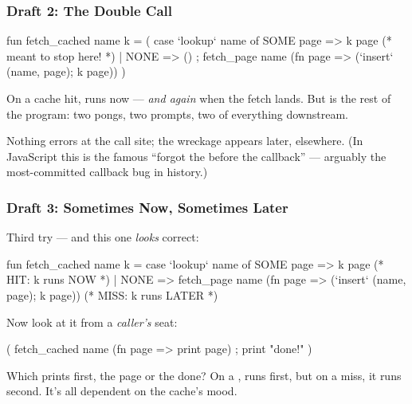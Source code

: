 \documentclass[aspectratio=169]{beamer}
\begin{document}
\begin{frame}[fragile]
  \frametitle{Draft 2: The Double Call}

  \begin{codeblock}
    fun fetch_cached name k =
      ( case `lookup` name of
          SOME page => k page    (* meant to stop here! *)
        | NONE => ()
      ; fetch_page name (fn page =>
          (`insert` (name, page); k page)) )
\end{codeblock}

  \pause
  \vspace{\fill}

  On a cache hit,  runs now --- \textit{and again} when the
  fetch lands. But  is the rest of the program: two pongs, two
  prompts, two of everything downstream.

  \pause
  \vspace{\fill}

  Nothing errors at the call site; the wreckage appears later,
  elsewhere. (In JavaScript this is the famous ``forgot the
   before the callback'' --- arguably the most-committed
  callback bug in history.)
\end{frame}

\begin{frame}[fragile]
  \frametitle{Draft 3: Sometimes Now, Sometimes Later}

  Third try --- and this one \textit{looks} correct:

  \begin{codeblock}
    fun fetch_cached name k =
      case `lookup` name of
        SOME page => k page               (* HIT: k runs NOW   *)
      | NONE => fetch_page name (fn page =>
          (`insert` (name, page); k page)) (* MISS: k runs LATER *)
\end{codeblock}

  \pause

  Now look at it from a \textit{caller's} seat:

  \begin{codeblock}
    ( fetch_cached name (fn page => print page)
    ; print "done!" )
\end{codeblock}

  Which prints first, the page or the done? On a ,
   runs first, but on a miss, it runs second.
  It's all dependent on the cache's mood.
\end{frame}
\end{document}
